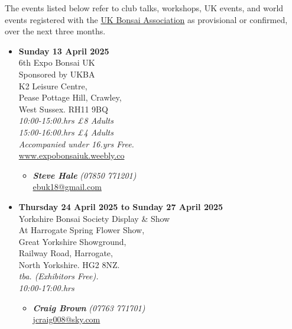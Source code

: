 \label{2025-04-events}
\noindent
The events listed below refer to club talks, workshops, UK events, and world events registered with the \href{https://www.ukbonsaiassoc.org/events.html}{UK Bonsai Association} as provisional or confirmed, over the next three months.
\begin{itemize}

    \item \textbf{Sunday 13 April 2025}
    \\
    6th Expo Bonsai UK \\
    Sponsored by UKBA \\
    K2 Leisure Centre, \\
    Pease Pottage Hill, Crawley, \\
    West Sussex. RH11 9BQ
    \\
    \emph{10:00-15:00.hrs £8 Adults} \\
    \emph{15:00-16:00.hrs £4 Adults} \\
    \emph{Accompanied under 16.yrs Free.}
    \\
    \href{http://www.expobonsaiuk.weebly.co/}{www.expobonsaiuk.weebly.co}
    \begin{itemize}
        \item \textbf{\emph{Steve Hale}} \emph{(07850 771201)} \\
        \href{mailto:ebuk18@gmail.com}{ebuk18@gmail.com} 
    \end{itemize}

    \item \textbf{Thursday 24 April 2025 to Sunday 27 April 2025}
    \\
    Yorkshire Bonsai Society Display \& Show \\
    At Harrogate Spring Flower Show, \\
    Great Yorkshire Showground, \\
    Railway Road, Harrogate, \\
    North Yorkshire. HG2 8NZ.
    \\
    \emph{tba. (Exhibitors Free).} \\
    \emph{10:00-17:00.hrs}
    \begin{itemize}
        \item \textbf{\emph{Craig Brown}} \emph{(07763 771701)} \\
        \href{mailto:jcraig008@sky.com}{jcraig008@sky.com} 
    \end{itemize}


\end{itemize}
